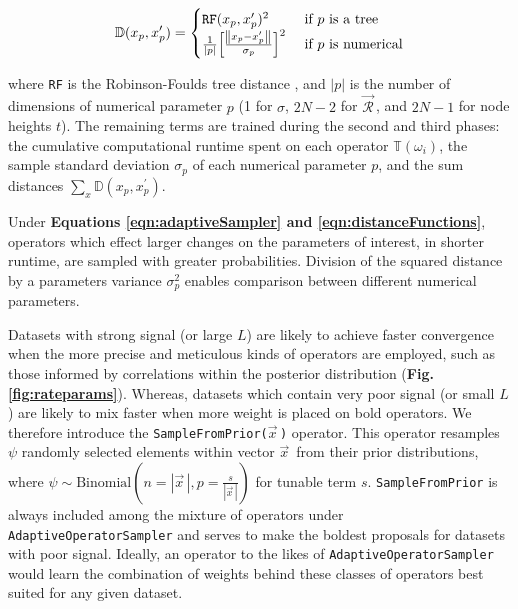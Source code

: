 \documentclass[10pt,letterpaper]{article}
\begin{document}
\begin{align}
\label{eqn:distanceFunctions} 
	\mathbb{D}(x_p, x_p^\prime) = \begin{cases} \texttt{RF}(x_p, x_p^\prime)^2 & \text{ if } p \text{ is a tree} \\ 
	\frac{1}{|p|} \Big[ \frac{\norm{x_p - x_p^\prime}}{\sigma_p} \Big]^2    & \text{ if } p \text{ is numerical}  \end{cases}
\end{align}


where \texttt{RF} is the Robinson-Foulds tree distance \cite{robinson1981comparison}, and $|p|$ is the number of dimensions of numerical parameter $p$ (1 for $\sigma$, $2N-2$ for $\vec{\mathcal{R}}^{\,}$, and $2N-1$ for node heights $t$).
The remaining terms are trained during the second and third phases: the cumulative computational runtime spent on each operator $\mathbb{T}(\omega_i)$, the sample standard deviation $\sigma_p$ of each numerical parameter $p$, and the sum distances $\sum_x \mathbb{D}(x_p, x_p^\prime)$.








Under \textbf{Equations \ref{eqn:adaptiveSampler} and \ref{eqn:distanceFunctions}}, operators which effect larger changes on the parameters of interest, in shorter runtime, are sampled with greater probabilities. 
Division of the squared distance by a parameters variance $\sigma^2_p$ enables comparison between different numerical parameters.


Datasets with strong signal (or large $L$) are likely to achieve faster convergence when the more precise and meticulous kinds of operators are employed, such as those informed by correlations within the posterior distribution (\textbf{Fig. \ref{fig:rateparams}}).
Whereas, datasets which contain very poor signal (or small $L$) are likely to mix faster when more weight is placed on bold operators. 
We therefore introduce the \texttt{SampleFromPrior($\vec{x}^{\,}$)} operator.
This operator resamples $\psi$ randomly selected elements within vector $\vec{x}^{\,}$ from their prior distributions, where $\psi \sim \text{Binomial}(n=|\vec{x}^{\,}|, p=\frac{s}{|\vec{x}^{\,}|})$ for tunable term $s$.
\texttt{SampleFromPrior} is always included among the mixture of operators under \texttt{AdaptiveOperatorSampler} and serves to make the boldest proposals for datasets with poor signal.
Ideally, an operator to the likes of \texttt{AdaptiveOperatorSampler} would learn the combination of weights behind these classes of operators best suited for any given dataset.
 
\end{document}
